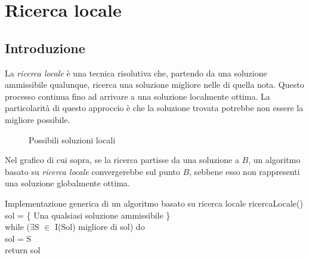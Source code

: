 \chapter{Ricerca locale}
\section{Introduzione}
La \emph{ricerca locale} è una tecnica risolutiva che, partendo da una soluzione
ammissibile qualunque, ricerca una soluzione migliore nelle  di
quella nota. Questo processo continua fino ad arrivare a una soluzione localmente
ottima. La particolarità di questo approccio è che la soluzione trovata potrebbe
non essere la migliore possibile.

\begin{figure}[h!]
\centering
{}
\caption{Possibili soluzioni locali}
\end{figure}

\noindent
Nel grafico di cui sopra, se la ricerca partisse da una soluzione  a
$B$, un algoritmo basato su \emph{ricerca locale} convergerebbe sul punto
$B$, sebbene esso non rappresenti una soluzione globalmente ottima.

\begin{minicode}{Implementazione generica di un algoritmo basato su ricerca locale}
\ind{} ricercaLocale()\\
     sol = \{ Una qualsiasi soluzione ammissibile \}\\
    \indf while ($\exists$S $\in$ I(Sol) migliore di sol) do\\
        sol = S\\
    \indf return sol
\end{minicode}

